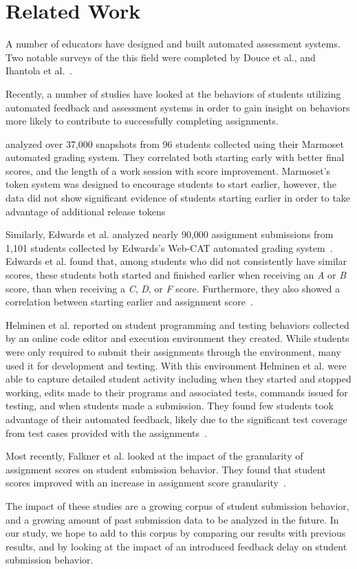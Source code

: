 \section{Related Work}

A number of educators have designed and built automated assessment systems. Two
notable surveys of the this field were completed by Douce et al., and Ihantola
et al.~\cite{Douce:2005:ATA:1163405.1163409,
  Ihantola:2010:RRS:1930464.1930480}.

Recently, a number of studies have looked at the behaviors of students
utilizing automated feedback and assessment systems in order to gain insight on
behaviors more likely to contribute to successfully completing assignments.

\spacco{} analyzed over 37,000 snapshots from 96 students collected using their
Marmoset automated grading system. They correlated both starting early with
better final scores, and the length of a work session with score
improvement. Marmoset's token system was designed to encourage students to
start earlier, however, the data did not show significant evidence of students
starting earlier in order to take advantage of additional release
tokens~\cite{Spacco:2013:TIP:2462476.2465594, Spacco:2006:EMD:1140124.1140131}

Similarly, Edwards et al. analyzed nearly 90,000 assignment submissions from
1,101 students collected by Edwards's Web-CAT automated grading
system~\cite{Edwards:2003:RCS:949344.949390}. Edwards et al. found that, among
students who did not consistently have similar scores, these students both
started and finished earlier when receiving an \emph{A} or \emph{B} score, than
when receiving a \emph{C}, \emph{D}, or \emph{F} score. Furthermore, they also
showed a correlation between starting earlier and assignment
score~\cite{Edwards:2009:CEI:1584322.1584325}.

Helminen et al. reported on student programming and testing behaviors collected
by an online code editor and execution environment they created. While students
were only required to submit their assignments through the environment, many
used it for development and testing. With this environment Helminen et al. were
able to capture detailed student activity including when they started and
stopped working, edits made to their programs and associated tests, commands
issued for testing, and when students made a submission.  They found few
students took advantage of their automated feedback, likely due to the
significant test coverage from test cases provided with the
assignments~\cite{Helminen:2013:RAI:2526968.2526970}.

Most recently, Falkner et al. looked at the impact of the granularity of
assignment scores on student submission behavior. They found that student
scores improved with an increase in assignment score
granularity~\cite{Falkner:2014:IEA:2538862.2538896}.

The impact of these studies are a growing corpus of student submission
behavior, and a growing amount of past submission data to be analyzed in the
future. In our study, we hope to add to this corpus by comparing our results
with previous results, and by looking at the impact of an introduced feedback
delay on student submission behavior.
